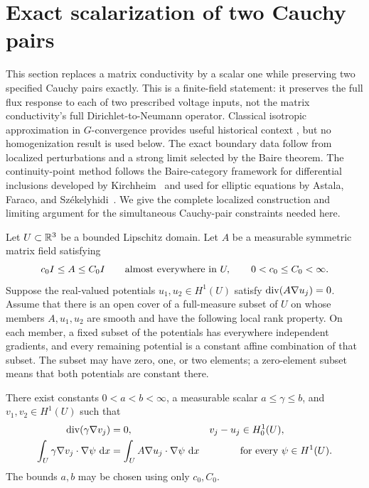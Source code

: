 \section{Exact scalarization of two Cauchy pairs}
\label{sec:scalarization}

This section replaces a matrix conductivity by a scalar one while
preserving two specified Cauchy pairs exactly. This is a finite-field
statement: it preserves the full flux response to each of two prescribed
voltage inputs, not the matrix conductivity's full
Dirichlet-to-Neumann operator. Classical isotropic approximation in
$G$-convergence provides useful historical context
\cite{MarinoSpagnolo}, but no homogenization result is used below.
The exact boundary data follow from localized perturbations and a
strong limit selected by the Baire theorem.
The continuity-point method follows the Baire-category framework for
differential inclusions developed by Kirchheim~\cite{Kirchheim} and
used for elliptic equations by Astala, Faraco, and
Sz\'ekelyhidi~\cite[Lemmas~3.7--3.8]{AstalaFaracoSzekelyhidi}.
We give the complete
localized construction and limiting argument for the simultaneous
Cauchy-pair constraints needed here.

\begin{theorem}
\label{thm:scalarization}
Let $U\subset\mathbb R^3$ be a bounded Lipschitz domain. Let $A$ be a
measurable symmetric matrix field satisfying
\[
 c_0I\leq A\leq C_0I\qquad\text{almost everywhere in }U,
 \qquad 0<c_0\leq C_0<\infty.
\]
Suppose the real-valued potentials $u_1,u_2\in H^1(U)$ satisfy
$\operatorname{div}(A\nabla u_j)=0$. Assume that there is an open cover of a
full-measure subset of $U$ on whose members $A,u_1,u_2$ are smooth
and have the following local rank property. On each member, a fixed
subset of the potentials has everywhere independent gradients, and
every remaining potential is a constant affine combination of that
subset. The subset may have zero, one, or two elements; a zero-element
subset means that both potentials are constant there.

There exist constants $0<a<b<\infty$, a measurable scalar
$a\leq\gamma\leq b$, and $v_1,v_2\in H^1(U)$ such that
\begin{align}
 \operatorname{div}(\gamma\nabla v_j)&=0,
 &v_j-u_j&\in H^1_0(U), \label{sc:conclusion-equations}\\
 \int_U\gamma\nabla v_j\cdot\nabla\psi\,\,\mathrm d x
 &=\int_U A\nabla u_j\cdot\nabla\psi\,\,\mathrm d x
 &&\text{for every }\psi\in H^1(U). \label{sc:conclusion-flux}
\end{align}
The bounds $a,b$ may be chosen using only $c_0,C_0$.
\end{theorem}


